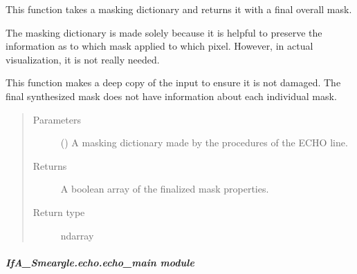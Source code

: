 \documentclass[letterpaper,10pt,english]{sphinxmanual}
\begin{document}
\begin{fulllineitems}
\label{\detokenize{python_docstrings/IfA_Smeargle.echo.echo_functions:IfA_Smeargle.echo.echo_functions.echo_synthesize_mask_dictionary}}
This function takes a masking dictionary and returns it with a
final overall mask.

The masking dictionary is made solely because it is helpful to preserve
the information as to which mask applied to which pixel. However, in
actual visualization, it is not really needed.

This function makes a deep copy of the input to ensure it is not
damaged. The final synthesized mask does not have information about
each individual mask.
\begin{quote}\begin{description}
\item[{Parameters}] \leavevmode
{} () \textendash{} A masking dictionary made by the procedures of the ECHO line.

\item[{Returns}] \leavevmode
{} \textendash{} A boolean array of the finalized mask properties.

\item[{Return type}] \leavevmode
ndarray

\end{description}\end{quote}

\end{fulllineitems}



\subparagraph{IfA\_Smeargle.echo.echo\_main module}
\label{\detokenize{python_docstrings/IfA_Smeargle.echo.echo_main:module-IfA_Smeargle.echo.echo_main}}\label{\detokenize{python_docstrings/IfA_Smeargle.echo.echo_main:ifa-smeargle-echo-echo-main-module}}\label{\detokenize{python_docstrings/IfA_Smeargle.echo.echo_main::doc}}
\end{document}
